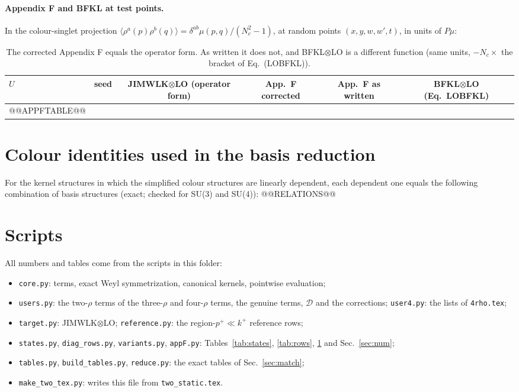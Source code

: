 \documentclass[10pt]{article}
\numberwithin{equation}{section}
\begin{document}
\paragraph{Appendix F and BFKL at test points.} In the colour-singlet projection $\langle\rho^a(p)\rho^b(q)\rangle=\delta^{ab}\mu(p,q)/(N_c^2-1)$, at random points $(x,y,w,w',t)$, in units of $P\mu$:
\begin{table}[h]
\centering\small
\begin{tabular}{@{}l c c c c c@{}}
$U$ & seed & JIMWLK$\otimes$LO (operator form) & App.\ F corrected & App.\ F as written & BFKL$\otimes$LO (Eq.~LOBFKL)\\ \hline
@@APPFTABLE@@
\end{tabular}
\caption{The corrected Appendix F equals the operator form. As written it does not, and BFKL$\otimes$LO is a different function (same units, $-N_c\times$ the bracket of Eq.~(LOBFKL)).}
\label{tab:appF}
\end{table}

\appendix
\section{Colour identities used in the basis reduction}\label{app:rel}
For the kernel structures in which the simplified colour structures are linearly dependent, each dependent one equals the following combination of basis structures (exact; checked for SU(3) and SU(4)):
@@RELATIONS@@

\section{Scripts}\label{app:scripts}
All numbers and tables come from the scripts in this folder:
\begin{itemize}
\item \texttt{core.py}: terms, exact Weyl symmetrization, canonical kernels, pointwise evaluation;
\item \texttt{users.py}: the two-$\rho$ terms of the three-$\rho$ and four-$\rho$ terms, the genuine terms, $\mathcal D$ and the corrections; \texttt{user4.py}: the lists of \texttt{4rho.tex};
\item \texttt{target.py}: JIMWLK$\otimes$LO; \texttt{reference.py}: the region-$p^+\ll k^+$ reference rows;
\item \texttt{states.py}, \texttt{diag\_rows.py}, \texttt{variants.py}, \texttt{appF.py}: Tables~\ref{tab:states}, \ref{tab:rows}, \ref{tab:appF} and Sec.~\ref{sec:num};
\item \texttt{tables.py}, \texttt{build\_tables.py}, \texttt{reduce.py}: the exact tables of Sec.~\ref{sec:match};
\item \texttt{make\_two\_tex.py}: writes this file from \texttt{two\_static.tex}.
\end{itemize}
\end{document}
